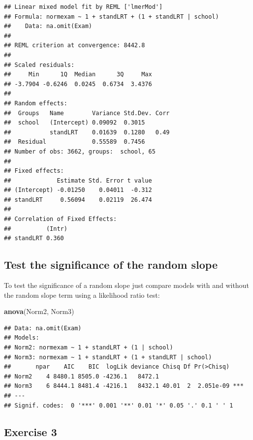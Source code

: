 \documentclass[
]{book}
\newenvironment{Shaded}{\begin{snugshade}}{\end{snugshade}}
\newcommand{\KeywordTok}[1]{\textcolor[rgb]{0.13,0.29,0.53}{\textbf{#1}}}
\newcommand{\NormalTok}[1]{#1}
\begin{document}
\begin{verbatim}
## Linear mixed model fit by REML ['lmerMod']
## Formula: normexam ~ 1 + standLRT + (1 + standLRT | school)
##    Data: na.omit(Exam)
## 
## REML criterion at convergence: 8442.8
## 
## Scaled residuals: 
##     Min      1Q  Median      3Q     Max 
## -3.7904 -0.6246  0.0245  0.6734  3.4376 
## 
## Random effects:
##  Groups   Name        Variance Std.Dev. Corr
##  school   (Intercept) 0.09092  0.3015       
##           standLRT    0.01639  0.1280   0.49
##  Residual             0.55589  0.7456       
## Number of obs: 3662, groups:  school, 65
## 
## Fixed effects:
##             Estimate Std. Error t value
## (Intercept) -0.01250    0.04011  -0.312
## standLRT     0.56094    0.02119  26.474
## 
## Correlation of Fixed Effects:
##          (Intr)
## standLRT 0.360
\end{verbatim}

\hypertarget{test-the-significance-of-the-random-slope}{%
\subsection{Test the significance of the random slope}\label{test-the-significance-of-the-random-slope}}

To test the significance of a random slope just compare models with and without the random slope term using a likelihood ratio test:

\begin{Shaded}
\begin{Highlighting}[]
  \KeywordTok{anova}\NormalTok{(Norm2, Norm3) }
\end{Highlighting}
\end{Shaded}

\begin{verbatim}
## Data: na.omit(Exam)
## Models:
## Norm2: normexam ~ 1 + standLRT + (1 | school)
## Norm3: normexam ~ 1 + standLRT + (1 + standLRT | school)
##       npar    AIC    BIC  logLik deviance Chisq Df Pr(>Chisq)    
## Norm2    4 8480.1 8505.0 -4236.1   8472.1                        
## Norm3    6 8444.1 8481.4 -4216.1   8432.1 40.01  2  2.051e-09 ***
## ---
## Signif. codes:  0 '***' 0.001 '**' 0.01 '*' 0.05 '.' 0.1 ' ' 1
\end{verbatim}

\hypertarget{exercise-3-1}{%
\subsection{Exercise 3}\label{exercise-3-1}}
\end{document}
